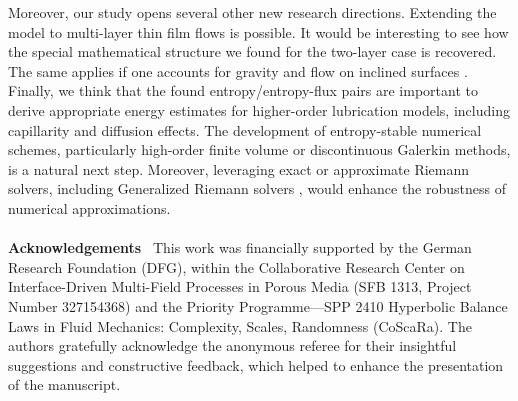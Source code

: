 \documentclass[11pt]{article}
\numberwithin{equation}{section}
\newtheorem{counter example}[theorem]{Counter Example}
\begin{document}
{Moreover, our study opens several other new research directions. Extending the model to multi-layer thin film flows is possible. It would be interesting to see how the special mathematical structure we found for the two-layer case is recovered. The same applies if one accounts for gravity and flow on inclined surfaces \cite{barthwal2025existence}. Finally, we think that the found entropy/entropy-flux pairs are important to derive appropriate energy estimates for higher-order lubrication models, including 
capillarity and diffusion effects.
The development of entropy-stable numerical schemes, particularly high-order finite volume or discontinuous Galerkin methods, is a natural next step. Moreover, leveraging exact or approximate Riemann solvers, including Generalized Riemann solvers \cite{barthwal2025generalized}, would enhance the robustness of numerical approximations.
\medskip 
\vspace{-0.2 cm}\\\\
\textbf{Acknowledgements}~  This work was financially supported by the German Research Foundation (DFG), within the  Collaborative Research Center on Interface-Driven Multi-Field Processes in Porous Media (SFB 1313, Project Number 327154368) and the Priority Programme—SPP 2410 Hyperbolic Balance Laws in Fluid Mechanics: Complexity, Scales, Randomness (CoScaRa). The authors gratefully acknowledge the anonymous referee for their insightful suggestions and constructive feedback, which helped to enhance the presentation of the manuscript.\\
\appendix
}
\end{document}
